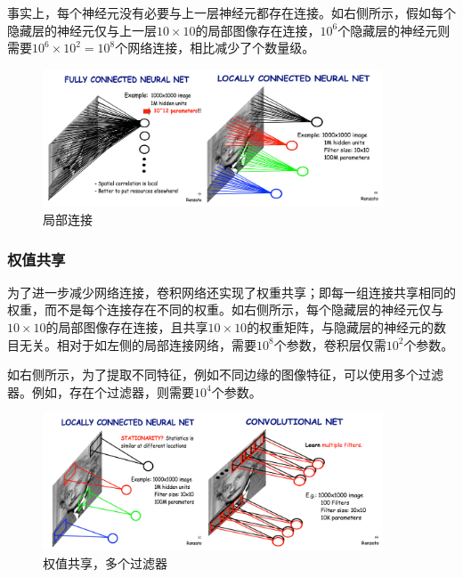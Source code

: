 \begin{content}
\begin{content}
事实上，每个神经元没有必要与上一层神经元都存在连接。如右侧所示，假如每个隐藏层的神经元仅与上一层$ 10 \times 10 $的局部图像存在连接，$ 10^6 $个隐藏层的神经元则需要$ 10^6 \times 10^2 = 10^8$个网络连接，相比减少了个数量级。

\begin{figure}[H]
\centering
\includegraphics[width=0.9\textwidth]{figures/mnist-conv-local-conn.png}
\caption{局部连接}
 \label{fig:mnist-conv-local-conn}
\end{figure}

\subsubsection{权值共享}

为了进一步减少网络连接，卷积网络还实现了权重共享；即每一组连接共享相同的权重，而不是每个连接存在不同的权重。如右侧所示，每个隐藏层的神经元仅与$ 10 \times 10 $的局部图像存在连接，且共享$ 10 \times 10 $的权重矩阵，与隐藏层的神经元的数目无关。相对于如左侧的局部连接网络，需要$10^8$个参数，卷积层仅需$10^2$个参数。

如右侧所示，为了提取不同特征，例如不同边缘的图像特征，可以使用多个过滤器。例如，存在个过滤器，则需要$10^4$个参数。

\begin{figure}[H]
\centering
\includegraphics[width=0.9\textwidth]{figures/mnist-conv-local-conn-2.png}
\caption{权值共享，多个过滤器}
 \label{fig:mnist-conv-local-conn-2}
\end{figure}


\end{content}
\end{content}
